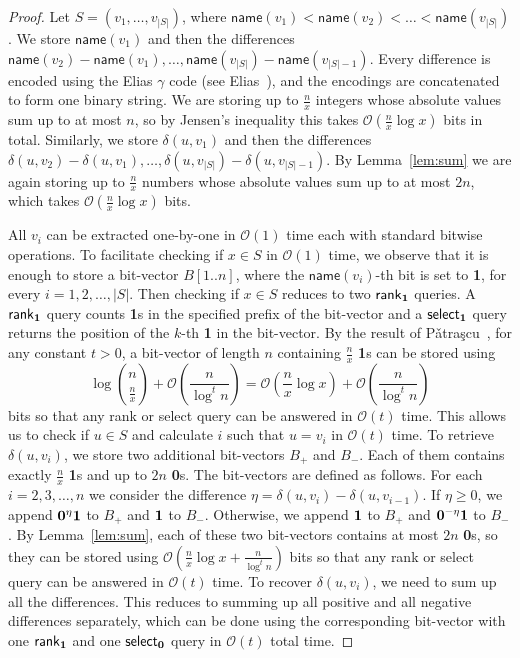 \documentclass{article}[11pt,letter]
\newcommand{\bigo}{\mathcal{O}}
\newcommand{\name}{\mathsf{name}}
\newcommand{\rank}{\mathsf{rank}}
\newcommand{\select}{\mathsf{select}}
\newcommand{\cost}{\delta}
\begin{document}
\begin{proof}
Let $S = (v_1,\ldots,v_{|S|})$, where $\name(v_1) < \name(v_2) < \ldots < \name(v_{|S|})$. We store $\name(v_1)$ and then the differences $\name(v_2) - \name(v_1), \ldots, \name(v_{|S|}) - \name(v_{|S|-1})$. Every difference is encoded using the Elias $\gamma$ code (see Elias~\cite{EliasGamma}), and the encodings are concatenated to form one binary
string. We are storing up to $\frac{n}{x}$ integers whose absolute values sum up to at most $n$, so by Jensen's inequality this takes $\bigo(\frac{n}{x} \log x)$ bits in total. Similarly, we store $\cost(u,v_1)$ and then the differences $\cost(u,v_2) - \cost(u,v_1), \ldots, \cost(u,v_{|S|}) - \cost(u,v_{|S|-1})$. By Lemma~\ref{lem:sum} we are again storing up to $\frac{n}{x}$ numbers whose absolute values sum up to at most $2n$, which takes $\bigo(\frac{n}{x} \log x)$ bits.

All $v_i$ can be extracted one-by-one in $\bigo(1)$ time each with standard bitwise operations.
To facilitate checking if $x\in S$ in $\bigo(1)$ time, we observe that it is enough to store a bit-vector
$B[1..n]$, where the $\name(v_i)$-th bit is set to {\bf 1}, for every $i=1,2,\ldots,|S|$. Then checking if
$x\in S$ reduces to two $\rank_{\bf 1}$ queries. A $\rank_{\bf 1}$ query counts {\bf 1}s in the specified prefix of the bit-vector and a $\select_{\bf 1}$ query returns the position of the $k$-th {\bf 1} in the bit-vector. By
the result of P\v{a}tra\c{s}cu~\cite{Succincter}, for any constant $t>0$, a bit-vector of length $n$ containing $\frac{n}{x}$
{\bf 1}s can be stored using
\[\log{ n \choose \frac{n}{x}}+\bigo(\frac{n}{\log^t n})=\bigo(\frac{n}{x}\log x)+\bigo(\frac{n}{\log^t n})\]
bits so that any rank or select query can be answered in $\bigo(t)$ time.
This allows us to check if $u\in S$ and calculate $i$ such that $u=v_i$ in $\bigo(t)$ time. To retrieve
$\cost(u,v_i)$, we store two additional bit-vectors $B_+$ and $B_-$. Each of them contains exactly
$\frac{n}{x}$ {\bf 1}s and up to $2n$ {\bf 0}s. The bit-vectors are defined as follows. For each $i=2,3,\ldots,n$
we consider the difference $\eta=\cost(u,v_{i})-\cost(u,v_{i-1})$. If $\eta\geq 0$, we append
${\bf 0}^\eta {\bf 1}$ to $B_+$ and ${\bf 1}$ to $B_-$. Otherwise, we append
${\bf 1}$ to $B_+$ and ${\bf 0}^{-\eta}{\bf 1}$ to $B_-$. By Lemma~\ref{lem:sum}, each of these
two bit-vectors contains at most $2n$ {\bf 0}s, so they can be stored using
$\bigo(\frac{n}{x}\log x+\frac{n}{\log^t n})$ bits so that any rank or select query can be answered
in $\bigo(t)$ time. To recover $\cost(u,v_i)$, we need to sum up all the differences. This reduces
to summing up all positive and all negative differences separately, which can be done using the
corresponding bit-vector with one $\rank_{\bf 1}$ and one $\select_{\bf 0}$ query in $\bigo(t)$ total time.
\end{proof}
\end{document}
